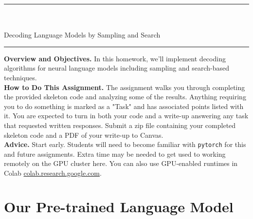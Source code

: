 \documentclass[a4paper,10pt]{article}
\begin{document}

\sffamily

\begin{center}
\noindent\rule{\textwidth}{1pt}\\[10pt]
{\color{blue!60}{AI539 Natural Language Processing with Deep Learning -- Homework 3}}\\[10pt]
{\LARGE Decoding Language Models by Sampling and Search}\\[10pt]
\noindent\rule{\textwidth}{1pt}
\end{center}

\noindent\textbf{Overview and Objectives.} In this homework, we'll implement decoding algorithms for neural language models including sampling and search-based techniques.\\

\noindent\textbf{How to Do This Assignment.} The assignment walks you through completing the provided skeleton code and analyzing some of the results. Anything requiring you to do something is marked as a "Task" and has associated points listed with it. You are expected to turn in both your code and a write-up answering any task that requested written responses. Submit a zip file containing your completed skeleton code and a PDF of your write-up to Canvas.\\ 

\noindent\textbf{Advice.} Start early. Students will need to become familiar with \texttt{pytorch} for this and future assignments. Extra time may be needed to get used to working remotely on the GPU cluster here. You can also use GPU-enabled runtimes in Colab \url{colab.research.google.com}.

\section{Our Pre-trained Language Model}
\end{document}
